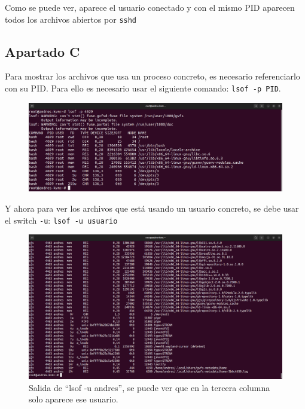 \documentclass{article}
\begin{document}
Como se puede ver, aparece el usuario conectado y con el mismo PID aparecen todos los archivos abiertos por \verb|sshd|

\bigskip

\subsection*{Apartado C}
Para mostrar los archivos que usa un proceso concreto, es necesario referenciarlo con su PID. Para ello es necesario usar el siguiente comando: \verb|lsof -p PID|.

\begin{figure}[H]
    \includegraphics[width=\textwidth]{imagenes/lsofp.png}
\end{figure} 

\newpage

Y ahora para ver los archivos que está usando un usuario concreto, se debe usar el switch \verb|-u|: \verb|lsof -u usuario|

\begin{figure}[H]
    \includegraphics[width=\textwidth]{imagenes/lsofuandres.png}
    \caption{Salida de ``lsof -u andres'', se puede ver que en la tercera columna solo aparece ese usuario.}
\end{figure}
\end{document}
